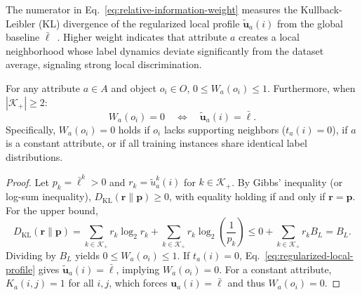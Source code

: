 The numerator in Eq.~\eqref{eq:relative-information-weight} measures the Kullback-Leibler (KL) divergence of the regularized local profile $\widetilde{\boldsymbol{u}}_a(i)$ from the global baseline $\bar{\boldsymbol{\ell}}$~\cite{SE}. Higher weight indicates that attribute $a$ creates a local neighborhood whose label dynamics deviate significantly from the dataset average, signaling strong local discrimination.

\begin{proposition}
	\label{prop:relative-weight-bounds}
	For any attribute $a \in A$ and object $o_i \in O$, $0 \le W_a(o_i) \le 1$. Furthermore, when $|\mathcal{K}_+| \ge 2$:
	\[
	W_a(o_i) = 0 \quad \Longleftrightarrow \quad \widetilde{\boldsymbol{u}}_a(i) = \bar{\boldsymbol{\ell}}.
	\]
	Specifically, $W_a(o_i) = 0$ holds if $o_i$ lacks supporting neighbors ($t_a(i) = 0$), if $a$ is a constant attribute, or if all training instances share identical label distributions.
\end{proposition}
\begin{proof}
	Let $p_k = \bar{\ell}^k > 0$ and $r_k = \widetilde{u}_a^k(i)$ for $k \in \mathcal{K}_+$. By Gibbs' inequality (or log-sum inequality), $D_{\mathrm{KL}}(\boldsymbol{r} \parallel \boldsymbol{p}) \ge 0$, with equality holding if and only if $\boldsymbol{r} = \boldsymbol{p}$. For the upper bound,
	\[
	D_{\mathrm{KL}}(\boldsymbol{r} \parallel \boldsymbol{p}) = \sum_{k \in \mathcal{K}_+} r_k \log_2 r_k + \sum_{k \in \mathcal{K}_+} r_k \log_2 \left(\frac{1}{p_k}\right) \le 0 + \sum_{k \in \mathcal{K}_+} r_k B_L = B_L.
	\]
	Dividing by $B_L$ yields $0 \le W_a(o_i) \le 1$. If $t_a(i) = 0$, Eq.~\eqref{eq:regularized-local-profile} gives $\widetilde{\boldsymbol{u}}_a(i) = \bar{\boldsymbol{\ell}}$, implying $W_a(o_i) = 0$. For a constant attribute, $K_a(i,j) = 1$ for all $i,j$, which forces $\boldsymbol{u}_a(i) = \bar{\boldsymbol{\ell}}$ and thus $W_a(o_i) = 0$.
\end{proof}

